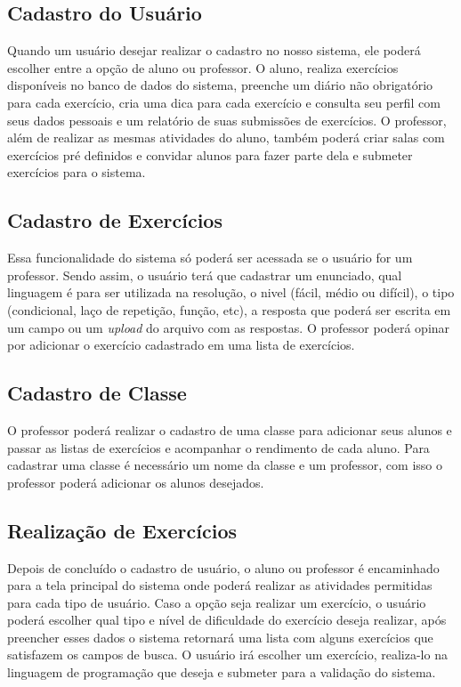 \subsection{Cadastro do Usuário}

Quando um usuário desejar realizar o cadastro no nosso sistema, ele poderá escolher entre a opção de aluno ou professor. O aluno, realiza exercícios disponíveis no banco de dados do sistema, preenche um diário não obrigatório para cada exercício, cria uma dica para cada exercício e consulta seu perfil com seus dados pessoais e um relatório de suas submissões de exercícios. O professor, além de realizar as mesmas atividades do aluno, também poderá criar salas com exercícios pré definidos e convidar alunos para fazer parte dela e submeter exercícios para o sistema.

\subsection{Cadastro de Exercícios}

Essa funcionalidade do sistema só poderá ser acessada se o usuário for um professor. Sendo assim, o usuário terá que cadastrar um enunciado, qual linguagem é para ser utilizada na resolução, o nivel (fácil, médio ou difícil), o tipo (condicional, laço de repetição, função, etc), a resposta que poderá ser escrita em um campo ou um \textit{upload} do arquivo com as respostas. O professor poderá opinar por adicionar o exercício cadastrado em uma lista de exercícios. 

\subsection{Cadastro de Classe}

O professor poderá realizar o cadastro de uma classe para adicionar seus alunos e passar as listas de exercícios e acompanhar o rendimento de cada aluno. Para cadastrar uma classe é necessário um nome da classe e um professor, com isso o professor poderá adicionar os alunos desejados.

\subsection{Realização de Exercícios}

Depois de concluído o cadastro de usuário, o aluno ou professor é encaminhado para a tela principal do sistema onde poderá realizar as atividades permitidas para cada tipo de usuário. Caso a opção seja realizar um exercício, o usuário poderá escolher qual tipo e nível de dificuldade do exercício deseja realizar, após preencher esses dados o sistema retornará uma lista com alguns exercícios que satisfazem os campos de busca. O usuário irá escolher um exercício, realiza-lo na linguagem de programação que deseja e submeter para a validação do sistema. 

